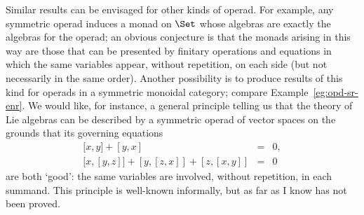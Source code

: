 Similar results can be envisaged for other kinds of operad.  For example,
any symmetric%
%
%
operad induces a monad on $\Set$ whose algebras are exactly
the algebras for the operad; an obvious conjecture is that the monads
arising in this way are those that can be presented by finitary operations
and equations in which the same variables appear, without repetition, on
each side (but not necessarily in the same order).  Another possibility is
to produce results of this kind for operads in a symmetric%
%
%
monoidal
category; compare Example~\ref{eg:opd-sr-enr}.  We would like, for
instance, a general principle telling us that the theory of Lie%
%
%
algebras
can be described by a symmetric operad of vector spaces on the grounds that
its governing equations
%
\begin{eqnarray*}
{[}x,y] + [y,x] 				&=	&0,	\\
{[}x,[y,z]] + [y,[z,x]] + [z,[x,y]] 		&=	&0
\end{eqnarray*}
%
are both `good': the same variables are involved, without repetition, in
each summand.  This principle is well-known informally, but as far as I
know has not been proved.

